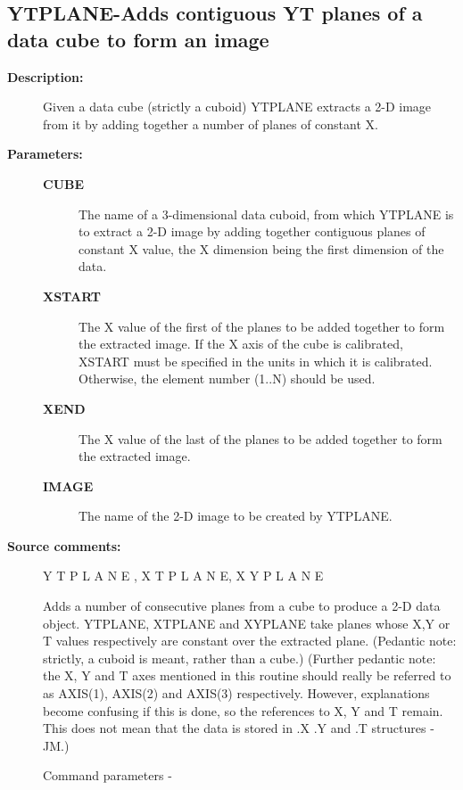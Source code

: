 \subsection{YTPLANE-\label{YTPLANE}Adds contiguous YT planes of a data cube to form an image}
\begin{description}

\item [\textbf{Description:}]
 Given a data cube (strictly a cuboid) YTPLANE extracts a 2-D image
 from it by adding together a number of planes of constant X.

\item [\textbf{Parameters:}]
\begin{description}
\item [\textbf{CUBE}]
 The name of a 3-dimensional data cuboid,
 from which YTPLANE is to extract a 2-D image by adding
 together contiguous planes of constant X value, the
 X dimension being the first dimension of the data.
\item [\textbf{XSTART}]
 The X value of the first of the planes to
 be added together to form the extracted image.  If
 the X axis of the cube is calibrated, XSTART must be
 specified in the units in which it is calibrated.
 Otherwise, the element number (1..N) should be used.
\item [\textbf{XEND}]
 The X value of the last of the planes to
 be added together to form the extracted image.
\item [\textbf{IMAGE}]
 The name of the 2-D image to be created by YTPLANE.
\end{description}

\item [\textbf{Source comments:}]
\begin{terminalv}
 Y T P L A N E ,   X T P L A N E,    X Y P L A N E

 Adds a number of consecutive planes from a cube to
 produce a 2-D data object.  YTPLANE, XTPLANE and XYPLANE
 take planes whose X,Y or T values respectively are
 constant over the extracted plane.  (Pedantic note:
 strictly, a cuboid is meant, rather than a cube.)
 (Further pedantic note: the X, Y and T axes
 mentioned in this routine should really be referred to
 as AXIS(1), AXIS(2) and AXIS(3) respectively. However,
 explanations become confusing if this is done, so the references to
 X, Y and T remain. This does not mean that the data is stored in
 .X .Y and .T structures - JM.)

 Command parameters -


\end{terminalv}
\end{description}
